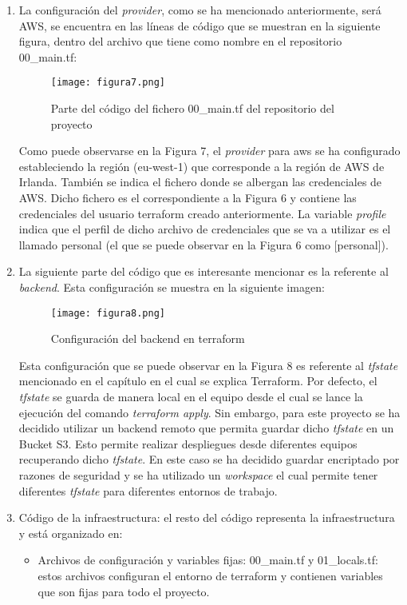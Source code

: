 \documentclass[../../memoria.tex]{subfiles}
\begin{document}
\begin{enumerate}
    \item La configuración del \textit{provider}, como se ha mencionado anteriormente, será AWS, se encuentra en las líneas de código que se muestran en la siguiente figura, dentro del archivo que tiene como nombre en el repositorio 00\_main.tf:
          \begin{figure}[H]
              \centering
              \texttt{[image: figura7.png]}
              \caption{Parte del código del fichero 00\_main.tf del repositorio del proyecto}
              \label{fig:figura7}
          \end{figure}
          Como puede observarse en la Figura 7, el \textit{provider} para aws se ha configurado estableciendo la región (eu-west-1) que corresponde a la región de AWS de Irlanda. También se indica el fichero donde se albergan las credenciales de AWS. Dicho fichero es el correspondiente a la Figura 6 y contiene las credenciales del usuario terraform creado anteriormente. La variable \textit{profile} indica que el perfil de dicho archivo de credenciales que se va a utilizar es el llamado personal (el que se puede observar en la Figura 6 como [personal]).

    \item La siguiente parte del código que es interesante mencionar es la referente al \textit{backend}. Esta configuración se muestra en la siguiente imagen:
          \begin{figure}[H]
              \centering
              \texttt{[image: figura8.png]}
              \caption{Configuración del backend en terraform }
              \label{fig:figura8}
          \end{figure}
          Esta configuración que se puede observar en la Figura 8 es referente al \textit{tfstate} mencionado en el capítulo en el cual se explica Terraform. Por defecto, el \textit{tfstate} se guarda de manera local en el equipo desde el cual se lance la ejecución del comando \textit{terraform apply}. Sin embargo, para este proyecto se ha decidido utilizar un backend remoto que permita guardar dicho \textit{tfstate} en un Bucket S3. Esto permite realizar despliegues desde diferentes equipos recuperando dicho \textit{tfstate}. En este caso se ha decidido guardar encriptado por razones de seguridad y se ha utilizado un \textit{workspace} el cual permite tener diferentes \textit{tfstate} para diferentes entornos de trabajo.

    \item Código de la infraestructura: el resto del código representa la infraestructura y está organizado en:
          \begin{itemize}
              \item Archivos de configuración y variables fijas: 00\_main.tf y 01\_locals.tf: estos archivos configuran el entorno de terraform y contienen variables que son fijas para todo el proyecto.


\end{itemize}
\end{enumerate}
\end{document}
